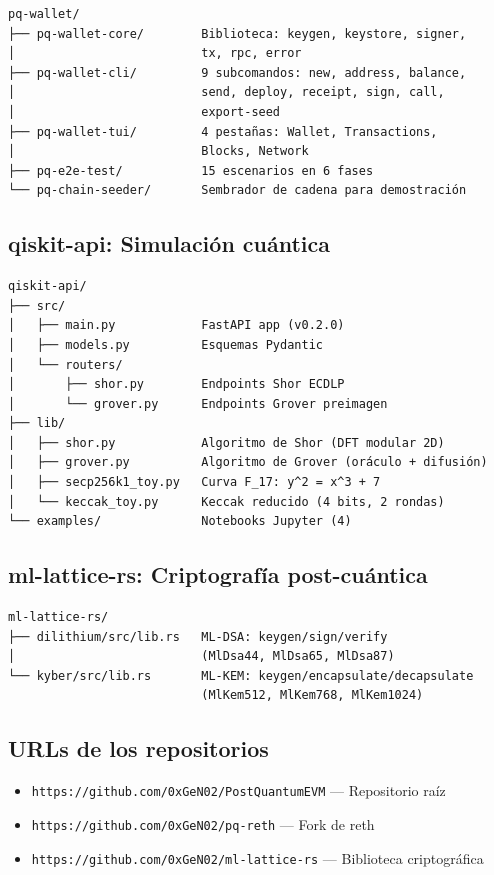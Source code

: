 \begin{verbatim}
pq-wallet/
├── pq-wallet-core/        Biblioteca: keygen, keystore, signer,
│                          tx, rpc, error
├── pq-wallet-cli/         9 subcomandos: new, address, balance,
│                          send, deploy, receipt, sign, call,
│                          export-seed
├── pq-wallet-tui/         4 pestañas: Wallet, Transactions,
│                          Blocks, Network
├── pq-e2e-test/           15 escenarios en 6 fases
└── pq-chain-seeder/       Sembrador de cadena para demostración
\end{verbatim}

\subsection*{qiskit-api: Simulación cuántica}

\begin{verbatim}
qiskit-api/
├── src/
│   ├── main.py            FastAPI app (v0.2.0)
│   ├── models.py          Esquemas Pydantic
│   └── routers/
│       ├── shor.py        Endpoints Shor ECDLP
│       └── grover.py      Endpoints Grover preimagen
├── lib/
│   ├── shor.py            Algoritmo de Shor (DFT modular 2D)
│   ├── grover.py          Algoritmo de Grover (oráculo + difusión)
│   ├── secp256k1_toy.py   Curva F_17: y^2 = x^3 + 7
│   └── keccak_toy.py      Keccak reducido (4 bits, 2 rondas)
└── examples/              Notebooks Jupyter (4)
\end{verbatim}

\subsection*{ml-lattice-rs: Criptografía post-cuántica}

\begin{verbatim}
ml-lattice-rs/
├── dilithium/src/lib.rs   ML-DSA: keygen/sign/verify
│                          (MlDsa44, MlDsa65, MlDsa87)
└── kyber/src/lib.rs       ML-KEM: keygen/encapsulate/decapsulate
                           (MlKem512, MlKem768, MlKem1024)
\end{verbatim}

\subsection*{URLs de los repositorios}

\begin{itemize}
  \item \texttt{https://github.com/0xGeN02/PostQuantumEVM} --- Repositorio raíz
  \item \texttt{https://github.com/0xGeN02/pq-reth} --- Fork de reth
  \item \texttt{https://github.com/0xGeN02/ml-lattice-rs} --- Biblioteca criptográfica
\end{itemize}
